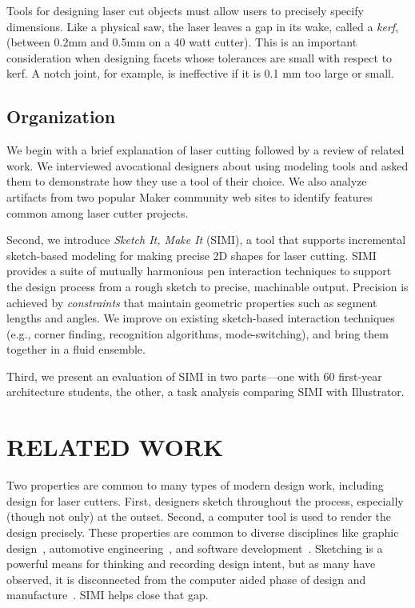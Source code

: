 \documentclass{article}
\begin{document}
Tools for designing laser cut objects must allow users to precisely
specify dimensions. Like a physical saw, the laser leaves a gap in its
wake, called a \textit{kerf}, (between 0.2mm and 0.5mm on a 40 watt
cutter). This is an important consideration when designing facets
whose tolerances are small with respect to kerf. A notch joint, for
example, is ineffective if it is 0.1 mm too large or small.
\subsection{Organization}

We begin with a brief explanation of laser cutting followed by a
review of related work. We interviewed avocational designers about
using modeling tools and asked them to demonstrate how they use a tool
of their choice. We also analyze artifacts from two popular Maker
community web sites to identify features common among laser cutter
projects.

Second, we introduce \textit{Sketch It, Make It} (SIMI), a tool that
supports incremental sketch-based modeling for making precise 2D
shapes for laser cutting. SIMI provides a suite of mutually harmonious
pen interaction techniques to support the design process from a rough
sketch to precise, machinable output. Precision is achieved by
\textit{constraints} that maintain geometric properties such as
segment lengths and angles. We improve on existing sketch-based
interaction techniques (e.g., corner finding, recognition algorithms,
mode-switching), and bring them together in a fluid ensemble.

Third, we present an evaluation of SIMI in two parts---one with 60
first-year architecture students, the other, a task analysis comparing
SIMI with Illustrator. 

\section{RELATED WORK}

Two properties are common to many types of modern design work,
including design for laser cutters. First, designers sketch throughout
the process, especially (though not only) at the outset. Second, a
computer tool is used to render the design precisely. These properties
are common to diverse disciplines like graphic
design~\cite{wong-rr-prototypes}, automotive
engineering~\cite{kara-styling}, and software
development~\cite{mangano-software-whiteboard}. Sketching
is a powerful means for thinking and recording design intent, but as
many have observed, it is disconnected from the computer aided phase
of design and
manufacture~\cite{company-sketching-in-engineering}. SIMI helps close
that gap.
\end{document}
